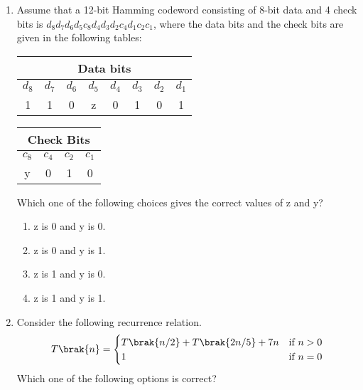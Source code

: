 \documentclass[a4paper, 11pt]{article}
\begin{document}
\begin{enumerate}
    \item Assume that a 12-bit Hamming codeword consisting of 8-bit data and 4 check bits is $d_8 d_7 d_6 d_5 c_8 d_4 d_3 d_2 c_4 d_1 c_2 c_1$, where the data bits and the check bits are given in the following tables:\\
    \begin{minipage}{0.45\textwidth}
    \centering
        \begin{tabular}{|c|c|c|c|c|c|c|c|}
            \hline
            \multicolumn{8}{|c|}{\textbf{Data bits}} \\
            \hline
            $d_8$ & $d_7$ & $d_6$ & $d_5$ & $d_4$ & $d_3$ & $d_2$ & $d_1$ \\
            \hline
            1 & 1 & 0 & z & 0 & 1 & 0 & 1 \\
            \hline
    \end{tabular}
    \end{minipage}
    \begin{minipage}{0.45\textwidth}
    \centering
        \begin{tabular}{|c|c|c|c|}
            \hline
            \multicolumn{4}{|c|}{\textbf{Check Bits}} \\
            \hline
            $c_8$&$c_4$&$c_2$&$c_1$\\
            \hline
            y & 0 & 1 & 0\\
            \hline
    \end{tabular}
    \end{minipage}
    Which one of the following choices gives the correct values of z and y?
    \begin{enumerate}
        \item z is 0 and y is 0.
        \item z is 0 and y is 1.
        \item z is 1 and y is 0.
        \item z is 1 and y is 1.
    \end{enumerate}
    \hfill{}
    
    \item Consider the following recurrence relation.
    \[ T\brak{n} = \begin{cases} T\brak{n/2} + T\brak{2n/5} + 7n & \text{if } n > 0 \\ 1 & \text{if } n=0 \end{cases} \]
    Which one of the following options is correct?
    \begin{enumerate}
    \end{enumerate}
    \hfill{}
    

\end{enumerate}
\end{document}
